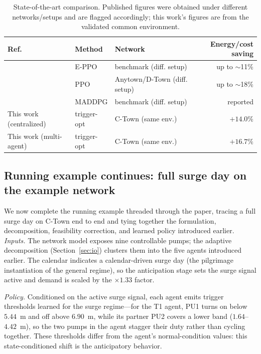 \documentclass[11pt,a4paper]{article}
\begin{document}
\begin{table}[t]
\centering
\caption{State-of-the-art comparison. Published figures were obtained under
different networks/setups and are flagged accordingly; this work's figures are
from the validated common environment.}
\label{tab:sota}
\begin{tabularx}{\textwidth}{@{}YYYR@{}}
\toprule
Ref. & Method & Network & Energy/cost saving \\
\midrule
\citet{Hu2023EPPO}    & E-PPO  & benchmark (diff. setup)      & up to $\sim$11\% \\
\citet{Pei2025RTPump}& PPO    & Anytown/D-Town (diff. setup) & up to $\sim$18\% \\
\citet{Hu2023MARL}    & MADDPG & benchmark (diff. setup)      & reported \\
This work (centralized) & trigger-opt & C-Town (same env.)     & $+14.0\%$ \\
This work (multi-agent) & trigger-opt & C-Town (same env.)     & $\mathbf{+16.7\%}$ \\
\bottomrule
\end{tabularx}
\end{table}

\subsection{Running example continues: full surge day on the example network}
\label{sec:worked}
We now complete the running example threaded through the paper, tracing a full
surge day on C-Town end to end and tying together the formulation, decomposition,
feasibility correction, and learned policy introduced earlier.
\emph{Inputs.} The network model exposes nine controllable pumps; the adaptive
decomposition (Section~\ref{sec:io}) clusters them into the five agents
introduced earlier. The calendar indicates a calendar-driven surge day (the
pilgrimage instantiation of the general regime), so the anticipation stage sets
the surge signal active and demand is scaled by the $\times1.33$ factor.

\emph{Policy.} Conditioned on the active surge signal, each agent emits trigger
thresholds learned for the surge regime---for the T1 agent, PU1 turns on below
$5.44$~m and off above $6.90$~m, while its partner PU2 covers a lower band
($1.64$--$4.42$~m), so the two pumps in the agent stagger their duty rather than
cycling together. These thresholds differ from the agent's normal-condition
values: this state-conditioned shift is the anticipatory behavior.
\end{document}
